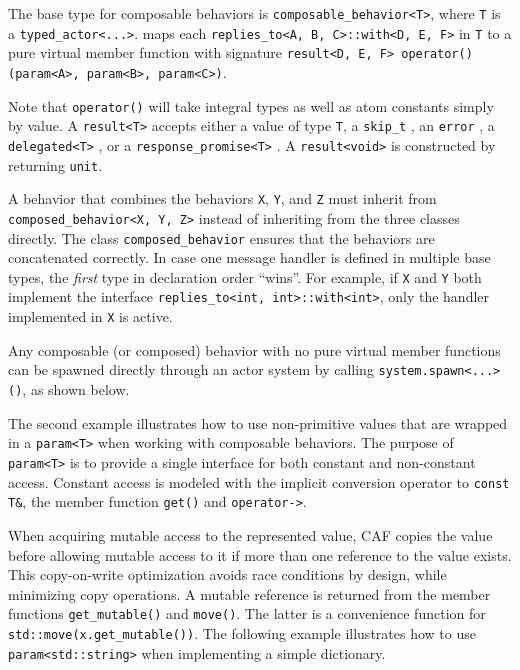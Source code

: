 The base type for composable behaviors is \lstinline^composable_behavior<T>^, where \lstinline^T^ is a \lstinline^typed_actor<...>^. \lib maps each \lstinline^replies_to<A, B, C>::with<D, E, F>^ in \lstinline^T^ to a pure virtual member function with signature \lstinline^result<D, E, F> operator()(param<A>, param<B>, param<C>)^.

Note that \lstinline^operator()^ will take integral types as well as atom constants simply by value. A \lstinline^result<T>^ accepts either a value of type \lstinline^T^, a \lstinline^skip_t^ , an \lstinline^error^ , a \lstinline^delegated<T>^ , or a \lstinline^response_promise<T>^ . A \lstinline^result<void>^ is constructed by returning \lstinline^unit^.

A behavior that combines the behaviors \lstinline^X^, \lstinline^Y^, and \lstinline^Z^ must inherit from \lstinline^composed_behavior<X, Y, Z>^ instead of inheriting from the three classes directly. The class \lstinline^composed_behavior^ ensures that the behaviors are concatenated correctly. In case one message handler is defined in multiple base types, the \emph{first} type in declaration order ``wins''. For example, if \lstinline^X^ and \lstinline^Y^ both implement the interface \lstinline^replies_to<int, int>::with<int>^, only the handler implemented in \lstinline^X^ is active.

Any composable (or composed) behavior with no pure virtual member functions can be spawned directly through an actor system by calling \lstinline^system.spawn<...>()^, as shown below.



\clearpage
The second example illustrates how to use non-primitive values that are wrapped in a \lstinline^param<T>^ when working with composable behaviors. The purpose of \lstinline^param<T>^ is to provide a single interface for both constant and non-constant access. Constant access is modeled with the implicit conversion operator to \lstinline^const T&^, the member function \lstinline^get()^ and \lstinline^operator->^. 

When acquiring mutable access to the represented value, CAF copies the value before allowing mutable access to it if more than one reference to the value exists. This copy-on-write optimization avoids race conditions by design, while minimizing copy operations. A mutable reference is returned from the member functions \lstinline^get_mutable()^ and \lstinline^move()^. The latter is a convenience function for \lstinline^std::move(x.get_mutable())^. The following example illustrates how to use \lstinline^param<std::string>^ when implementing a simple dictionary.


